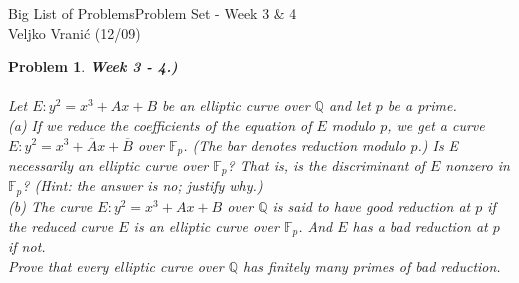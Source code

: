 \documentclass[12pt]{article}
\newtheorem{problem}{Problem}
\begin{document}
\noindent Big List of Problems\hfill Problem Set - Week 3 \& 4\\
Veljko Vranić (12/09)

\hrulefill


\begin{problem} \textbf{Week 3 - 4.)} \\ \\
Let $E: y^2 = x^3 + Ax + B$ be an elliptic curve over $\mathbb{Q}$ and let $p$ be a prime. \\

(a) If we reduce the coefficients of the equation of $E$ modulo $p$, we get a curve $E: y^2 = x^3 +\overline{A}x +\overline{B}$ over $\mathbb{F}_p$. (The bar denotes reduction modulo $p$.) Is E necessarily an
elliptic curve over $\mathbb{F}_p$? That is, is the discriminant of $E$ nonzero in $\mathbb{F}_p$? (Hint: the
answer is no; justify why.)  \\

(b) The curve $E: y^2 = x^3 + Ax + B$ over $\mathbb{Q}$ is said to have good reduction at $p$ if the reduced curve $E$ is an elliptic curve over $\mathbb{F}_p$. And $E$ has a bad reduction at $p$ if not. \\
Prove that every elliptic curve over $\mathbb{Q}$ has finitely many primes of bad reduction.
\end{problem}
\end{document}
